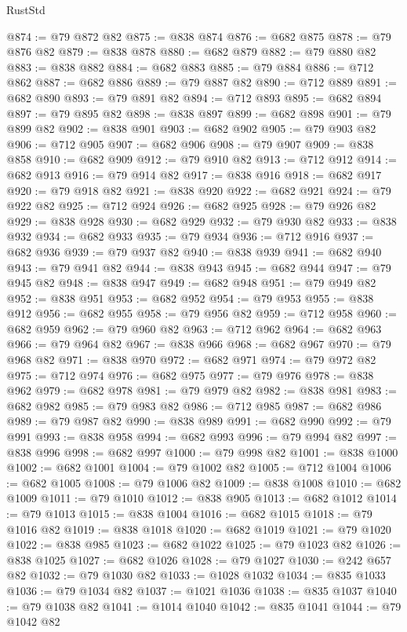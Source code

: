 \begin{lexlean}{RustStd}
\begin{coremodule}
{\begin{coremodule}
{{{{{{{{{{{{{{{{{{{{{{{{{{{{{{{@874 := @79 @872 @82
@875 := @838 @874
@876 := @682 @875
@878 := @79 @876 @82
@879 := @838 @878
@880 := @682 @879
@882 := @79 @880 @82
@883 := @838 @882
@884 := @682 @883
@885 := @79 @884
@886 := @712 @862
@887 := @682 @886
@889 := @79 @887 @82
@890 := @712 @889
@891 := @682 @890
@893 := @79 @891 @82
@894 := @712 @893
@895 := @682 @894
@897 := @79 @895 @82
@898 := @838 @897
@899 := @682 @898
@901 := @79 @899 @82
@902 := @838 @901
@903 := @682 @902
@905 := @79 @903 @82
@906 := @712 @905
@907 := @682 @906
@908 := @79 @907
@909 := @838 @858
@910 := @682 @909
@912 := @79 @910 @82
@913 := @712 @912
@914 := @682 @913
@916 := @79 @914 @82
@917 := @838 @916
@918 := @682 @917
@920 := @79 @918 @82
@921 := @838 @920
@922 := @682 @921
@924 := @79 @922 @82
@925 := @712 @924
@926 := @682 @925
@928 := @79 @926 @82
@929 := @838 @928
@930 := @682 @929
@932 := @79 @930 @82
@933 := @838 @932
@934 := @682 @933
@935 := @79 @934
@936 := @712 @916
@937 := @682 @936
@939 := @79 @937 @82
@940 := @838 @939
@941 := @682 @940
@943 := @79 @941 @82
@944 := @838 @943
@945 := @682 @944
@947 := @79 @945 @82
@948 := @838 @947
@949 := @682 @948
@951 := @79 @949 @82
@952 := @838 @951
@953 := @682 @952
@954 := @79 @953
@955 := @838 @912
@956 := @682 @955
@958 := @79 @956 @82
@959 := @712 @958
@960 := @682 @959
@962 := @79 @960 @82
@963 := @712 @962
@964 := @682 @963
@966 := @79 @964 @82
@967 := @838 @966
@968 := @682 @967
@970 := @79 @968 @82
@971 := @838 @970
@972 := @682 @971
@974 := @79 @972 @82
@975 := @712 @974
@976 := @682 @975
@977 := @79 @976
@978 := @838 @962
@979 := @682 @978
@981 := @79 @979 @82
@982 := @838 @981
@983 := @682 @982
@985 := @79 @983 @82
@986 := @712 @985
@987 := @682 @986
@989 := @79 @987 @82
@990 := @838 @989
@991 := @682 @990
@992 := @79 @991
@993 := @838 @958
@994 := @682 @993
@996 := @79 @994 @82
@997 := @838 @996
@998 := @682 @997
@1000 := @79 @998 @82
@1001 := @838 @1000
@1002 := @682 @1001
@1004 := @79 @1002 @82
@1005 := @712 @1004
@1006 := @682 @1005
@1008 := @79 @1006 @82
@1009 := @838 @1008
@1010 := @682 @1009
@1011 := @79 @1010
@1012 := @838 @905
@1013 := @682 @1012
@1014 := @79 @1013
@1015 := @838 @1004
@1016 := @682 @1015
@1018 := @79 @1016 @82
@1019 := @838 @1018
@1020 := @682 @1019
@1021 := @79 @1020
@1022 := @838 @985
@1023 := @682 @1022
@1025 := @79 @1023 @82
@1026 := @838 @1025
@1027 := @682 @1026
@1028 := @79 @1027
@1030 := @242 @657 @82
@1032 := @79 @1030 @82
@1033 := @1028 @1032
@1034 := @835 @1033
@1036 := @79 @1034 @82
@1037 := @1021 @1036
@1038 := @835 @1037
@1040 := @79 @1038 @82
@1041 := @1014 @1040
@1042 := @835 @1041
@1044 := @79 @1042 @82
}}}}}}}}}}}}}}}}}}}}}}}}}}}}}}}
\end{coremodule}}
\end{coremodule}
\end{lexlean}
